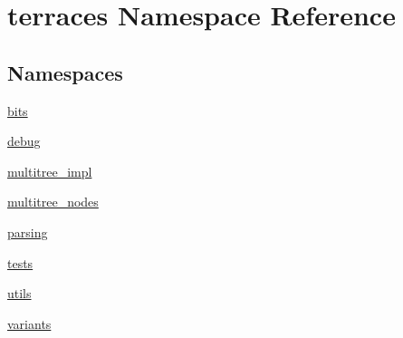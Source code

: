 \hypertarget{namespaceterraces}{}\section{terraces Namespace Reference}
\label{namespaceterraces}
\subsection*{Namespaces}
\begin{DoxyCompactItemize}
\item 
 \hyperlink{namespaceterraces_1_1bits}{bits}
\item 
 \hyperlink{namespaceterraces_1_1debug}{debug}
\item 
 \hyperlink{namespaceterraces_1_1multitree__impl}{multitree\+\_\+impl}
\item 
 \hyperlink{namespaceterraces_1_1multitree__nodes}{multitree\+\_\+nodes}
\item 
 \hyperlink{namespaceterraces_1_1parsing}{parsing}
\item 
 \hyperlink{namespaceterraces_1_1tests}{tests}
\item 
 \hyperlink{namespaceterraces_1_1utils}{utils}
\item 
 \hyperlink{namespaceterraces_1_1variants}{variants}
\end{DoxyCompactItemize}
